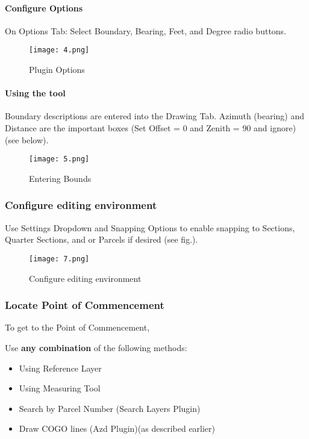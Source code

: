 \documentclass[class=book , crop=false]{standalone}
\begin{document}
\paragraph{Configure Options}
\large On Options Tab: Select Boundary, Bearing, Feet, and Degree radio buttons.
\begin{figure}[H]
\begin{center}
\texttt{[image: 4.png]}
\end{center}
\caption{Plugin Options}
\end{figure}
\clearpage

\paragraph{Using the tool}
\large Boundary descriptions are entered into the Drawing Tab. Azimuth (bearing) and Distance are the important boxes (Set Offset = 0 and Zenith = 90 and ignore)(see below).
\begin{figure}[H]
\begin{center}
\texttt{[image: 5.png]}
\end{center}
\caption{Entering Bounds}
\end{figure}

\clearpage

\subsubsection{Configure editing environment}
\Large Use Settings Dropdown and Snapping Options to enable snapping to Sections, Quarter Sections, and or Parcels if desired (see fig.).

\begin{figure}[H]
\begin{center}
\texttt{[image: 7.png]}
\end{center}
\caption{Configure editing environment}
\end{figure}

\clearpage

\subsubsection{\Large Locate Point of Commencement}
To get to the Point of Commencement,
\medskip

Use \textbf{any combination} of the following methods:
\begin{itemize}
\item{Using Reference Layer}
\item{Using Measuring Tool}
\item{Search by Parcel Number \small(Search Layers Plugin)}
\item{Draw COGO lines \small(Azd Plugin)}\small(as described earlier)
\end{itemize}
\end{document}

